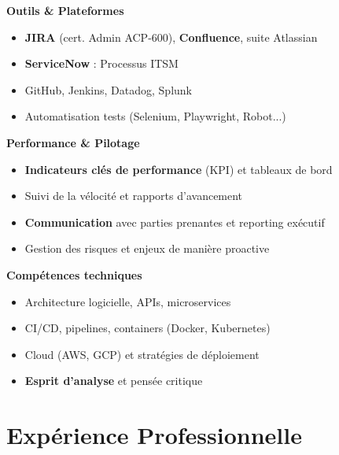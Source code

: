 \documentclass[11pt,a4paper]{article}
\newcommand{\highlight}[1]{\textcolor{primaryblue}{\textbf{#1}}}
\newcommand{\skilltitle}[1]{\normalsize\textcolor{primaryblue}{\textbf{#1}}}
\begin{document}
\hfill
\begin{minipage}[t]{0.42\textwidth}
\skilltitle{Outils \& Plateformes}
\begin{itemize}[leftmargin=10pt]
    \item \highlight{JIRA} (cert. Admin ACP-600), \highlight{Confluence}, suite Atlassian
    \item \highlight{ServiceNow} : Processus ITSM
    \item GitHub, Jenkins, Datadog, Splunk
    \item Automatisation tests (Selenium, Playwright, Robot...)
\end{itemize}

\skilltitle{Performance \& Pilotage}
\begin{itemize}[leftmargin=10pt]
    \item \highlight{Indicateurs clés de performance} (KPI) et tableaux de bord
    \item Suivi de la vélocité et rapports d'avancement
    \item \highlight{Communication} avec parties prenantes et reporting exécutif
    \item Gestion des risques et enjeux de manière proactive
\end{itemize}

\skilltitle{Compétences techniques}
\begin{itemize}[leftmargin=10pt]
    \item Architecture logicielle, APIs, microservices
    \item CI/CD, pipelines, containers (Docker, Kubernetes)
    \item Cloud (AWS, GCP) et stratégies de déploiement
    \item \highlight{Esprit d'analyse} et pensée critique
\end{itemize}
\end{minipage}


\section*{Expérience Professionnelle}
\end{document}
